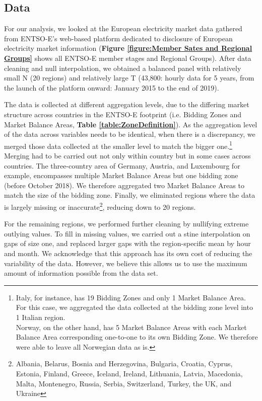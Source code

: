 \documentclass[12pt]{article}
\begin{document}
\subsection{Data}
For our analysis, we looked at the European electricity market data gathered from ENTSO-E's web-based platform dedicated to disclosure of European electricity market information (\textbf{Figure \ref{figure:Member Sates and Regional Groups}} shows all ENTSO-E member stages and Regional Groups). After data cleaning and null interpolation, we obtained a balanced panel with relatively small N (20 regions) and relatively large T (43,800: hourly data for 5 years, from the launch of the platform onward: January 2015 to the end of 2019).\par

The data is collected at different aggregation levels, due to the differing market structure across countries in the ENTSO-E footprint (i.e. Bidding Zones and Market Balance Areas, \textbf{Table \ref{table:ZoneDefinition}}). As the aggregation level of the data across variables needs to be identical, when there is a discrepancy, we merged those data collected at the smaller level to match the bigger one.\footnote{Italy, for instance, has 19 Bidding Zones and only 1 Market Balance Area. For this case, we aggregated the data collected at the bidding zone level into 1 Italian region.\\
\indent Norway, on the other hand, has 5 Market Balance Areas with each Market Balance Area corresponding one-to-one to its own Bidding Zone. We therefore were able to leave all Norwegian data as is.} Merging had to be carried out not only within country but in some cases across countries. The three-country area of Germany, Austria, and Luxembourg for example, encompasses multiple Market Balance Areas but one bidding zone (before October 2018). We therefore aggregated two Market Balance Areas to match the size of the bidding zone. Finally, we eliminated regions where the data is largely missing or inaccurate\footnote{Albania, Belarus, Bosnia and Herzegovina, Bulgaria, Croatia, Cyprus, Estonia, Finland, Greece, Iceland, Ireland, Lithuania, Latvia, Macedonia, Malta, Montenegro, Russia, Serbia, Switzerland, Turkey, the UK, and Ukraine}, reducing down to 20 regions.\par

For the remaining regions, we performed further cleaning by nullifying extreme outlying values. To fill in missing values, we carried out a stine interpolation on gaps of size one, and replaced larger gaps with the region-specific mean by hour and month. We acknowledge that this approach has its own cost of reducing the variability of the data. However, we believe this allows us to use the maximum amount of information possible from the data set.\par
\end{document}
